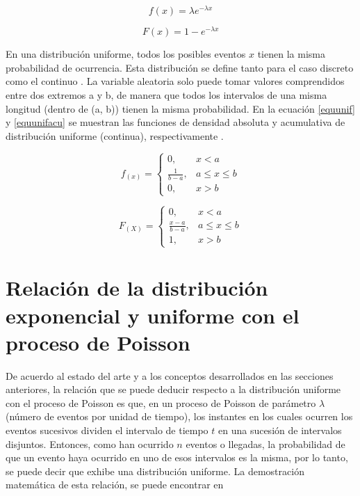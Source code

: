 \documentclass{article}
\begin{document}
\begin{equation} \label{equexpo} 
f(x) = \lambda e^{-\lambda x} 
\end{equation}

\begin{equation} \label{equexpoacu} 
F(x) = 1-e^{-\lambda x}
\end{equation}

En una distribución uniforme, todos los posibles eventos $x$ tienen la misma probabilidad de ocurrencia. Esta distribución se define tanto para el caso discreto como el continuo \cite{notasElisa}. La variable aleatoria solo puede tomar valores comprendidos entre dos extremos a y b, de manera que todos los intervalos de una misma longitud (dentro de (a, b)) tienen la misma probabilidad. En la ecuación \ref{equunif} y \ref{equunifacu} se muestran las funciones de densidad absoluta y acumulativa de distribución uniforme (continua), respectivamente \cite{notasElisa, walpole}.

\begin{equation} \label{equunif}
f_{(x)} = 
\begin{cases}
0, & x < a \\
\frac{1}{b-a}, & a \leq x \leq b \\ 
0, & x > b 
\end{cases} 
\end{equation}


\begin{equation} \label{equunifacu}
F_{(X)} = 
\begin{cases}
0, & x < a \\
\frac{x-a}{b-a}, & a \leq x \leq b \\ 
1, & x > b 
\end{cases} 
\end{equation}

\section{Relación de la distribución exponencial y uniforme con el proceso de Poisson}

De acuerdo al estado del arte y a los conceptos desarrollados en las secciones anteriores, la relación que se puede deducir respecto a la distribución uniforme con el proceso de Poisson es que, en un proceso de Poisson de parámetro $\lambda$ (número de eventos por unidad de tiempo), los instantes en los cuales ocurren los eventos sucesivos dividen el intervalo de tiempo $t$ en una sucesión de intervalos disjuntos. Entonces, como han ocurrido $n$ eventos o llegadas, la probabilidad de que un evento haya ocurrido en uno de esos intervalos es la misma, por lo tanto, se puede decir que exhibe una distribución uniforme. La demostración matemática de esta relación, se puede encontrar en \cite{taylor, walpole, notasclase}
\end{document}
